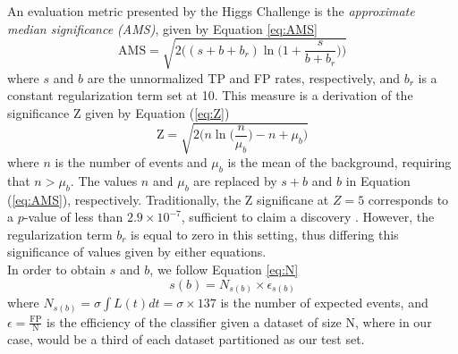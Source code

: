 An evaluation metric presented by the Higgs Challenge \cite{adam-bourdarios_learning_2014} is the \textit{approximate median significance (AMS)}, given by Equation \ref{eq:AMS}
\begin{equation}
    \text{AMS} = \sqrt{2\Big((s+b+b_r)\ln\Big(1+\frac{s}{b+b_r}\Big)\Big)}
    \label{eq:AMS}
\end{equation}
where $s$ and $b$ are the unnormalized TP and FP rates, respectively, and $b_r$ is a constant regularization term set at 10. This measure is a derivation of the significance Z given by Equation (\ref{eq:Z})
\begin{equation}
    \text{Z} = \sqrt{2\Big( n\ln\Big(\frac{n}{\mu_b}\Big)-n+\mu_b\Big)}
    \label{eq:Z}
\end{equation}
where $n$ is the number of events and $\mu_b$ is the mean of the background, requiring that $n>\mu_b$. The values $n$ and $\mu_b$ are replaced by $s+b$ and $b$ in Equation (\ref{eq:AMS}), respectively. Traditionally, the Z significane at $Z=5$ corresponds to a $p$-value of less than $2.9\times10^{-7}$, sufficient to claim a discovery \cite{adam-bourdarios_learning_2014}. However, the regularization term $b_r$ is equal to zero in this setting, thus differing this significance of values given by either equations. \\

In order to obtain $s$ and $b$, we follow Equation \ref{eq:N}
\begin{equation}
    s(b) = N_{s(b)}\times \epsilon_{s(b)} 
    \label{eq:N}
\end{equation}
where $N_{s(b)} = \sigma \int L(t) dt = \sigma \times 137$ \cite{thomson2013modern} is the number of expected events, and $\epsilon=\frac{\text{FP}}{\text{N}}$ is the efficiency of the classifier given a dataset of size N, where in our case, would be a third of each dataset partitioned as our test set.  


